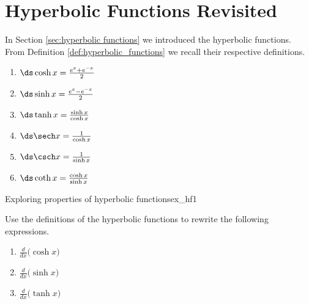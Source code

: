 
\section{Hyperbolic Functions Revisited}\label{sec:inv hyperbolic}\label{sec:hyperbolic revisited}

In Section \ref{sec:hyperbolic functions} we introduced the hyperbolic functions.  From Definition \ref{def:hyperbolic_functions} we recall their respective definitions. 

\begin{enumerate}
\item		$\ds \cosh x = \frac{e^x+e^{-x}}2$
\item		$\ds \sinh x = \frac{e^x-e^{-x}}2$
\item		$\ds \tanh x = \frac{\sinh x}{\cosh x}$
\item		$\ds \sech x = \frac{1}{\cosh x}$
\item		$\ds \csch x = \frac{1}{\sinh x}$
\item		$\ds \coth x = \frac{\cosh x}{\sinh x}$
\end{enumerate}


\begin{example}{Exploring properties of hyperbolic functions}{ex_hf1}
{
Use the definitions of the hyperbolic functions to rewrite the following expressions.
\begin{enumerate}
\item		$\frac{d}{dx}\big(\cosh x\big)$
\item		$\frac{d}{dx}\big(\sinh x\big)$
\item		$\frac{d}{dx}\big(\tanh x\big)$
\end{enumerate}
}
\end{example}


